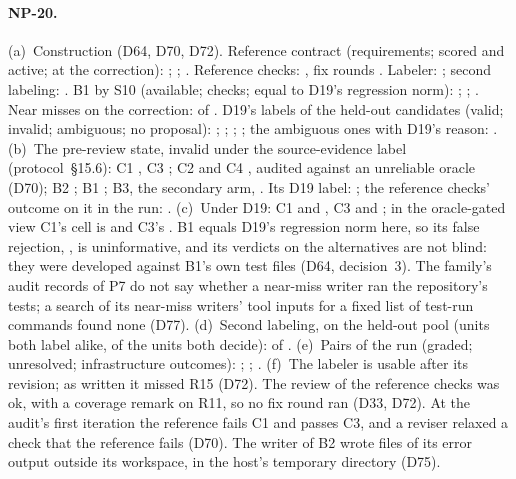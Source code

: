 \paragraph{NP-20.}
(a)~Construction (D64, D70, D72). Reference contract (requirements; scored and active; at the correction):
; ; . Reference checks:
, fix rounds . Labeler: ; second labeling:
. B1 by S10 (available; checks; equal to D19's regression norm): ;
; . Near misses on the correction:  of
. D19's labels of the held-out candidates (valid; invalid; ambiguous; no proposal):
; ; ; ; the ambiguous ones
with D19's reason: .
(b)~The pre-review state, invalid under the source-evidence label (protocol~\S15.6): C1 , C3
; C2  and C4 , audited against an unreliable oracle (D70); B2
; B1 ; B3, the secondary arm, . Its D19 label: ; the
reference checks' outcome on it in the run: .
(c)~Under D19: C1  and , C3  and ; in the oracle-gated
view C1's cell is  and C3's . B1 equals D19's regression norm here, so its false
rejection, , is uninformative, and its verdicts on the alternatives are not blind: they were developed
against B1's own test files (D64, decision~3). The family's audit records of P7 do not say whether a near-miss writer ran
the repository's tests; a search of its near-miss writers' tool inputs for a fixed list of test-run commands
found none (D77).
(d)~Second labeling, on the held-out pool (units both label alike, of the units both decide): 
of .
(e)~Pairs of the run (graded; unresolved; infrastructure outcomes): ; ;
.
(f)~The labeler is usable after its revision; as written it missed R15 (D72). The review of the reference checks was ok,
with a coverage remark on R11, so no fix round ran (D33, D72). At the audit's first iteration the reference fails C1 and
passes C3, and a reviser relaxed a check that the reference fails (D70). The writer of B2 wrote files of its error output
outside its workspace, in the host's temporary directory (D75).

